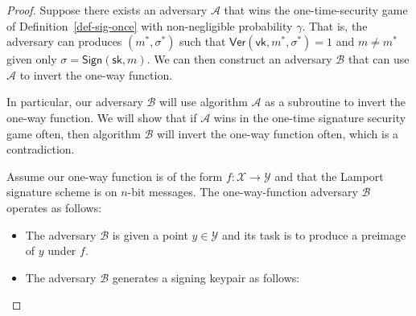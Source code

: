 \documentclass[
  letterpaper,
]{scrbook}
\providecommand{\tightlist}{%
  \setlength{\itemsep}{0pt}\setlength{\parskip}{0pt}}
\newcommand{\A}{\mathcal{A}}
\newcommand{\B}{\mathcal{B}}
\newcommand{\calA}{\mathcal{A}}
\newcommand{\calB}{\mathcal{B}}
\newcommand{\calX}{\mathcal{X}}
\newcommand{\calY}{\mathcal{Y}}
\newcommand{\Sign}{\mathsf{Sign}}
\newcommand{\Ver}{\mathsf{Ver}}
\newcommand{\sk}{\mathsf{sk}}
\newcommand{\vk}{\mathsf{vk}}
\newcommand{\sig}{\sigma}
\theoremstyle{definition}
\theoremstyle{plain}
\theoremstyle{plain}
\theoremstyle{remark}
\begin{document}
\begin{proof}
Suppose there exists an adversary \(\A\) that wins the one-time-security
game of Definition~\ref{def-sig-once} with non-negligible probability
\(\gamma\). That is, the adversary can produces \((m^*, \sig^*)\) such
that \(\Ver(\vk, m^*, \sig^*) = 1\) and \(m \neq m^*\) given only
\(\sig = \Sign(\sk, m)\). We can then construct an adversary \(\B\) that
can use \(\A\) to invert the one-way function.


In particular, our adversary \(\calB\) will use algorithm \(\calA\) as a
subroutine to invert the one-way function. We will show that if
\(\calA\) wins in the one-time signature security game often, then
algorithm \(\calB\) will invert the one-way function often, which is a
contradiction.

Assume our one-way function is of the form \(f \colon \calX \to \calY\)
and that the Lamport signature scheme is on \(n\)-bit messages. The
one-way-function adversary \(\calB\) operates as follows:

\begin{itemize}
\tightlist
\item
  The adversary \(\calB\) is given a point \(y \in \calY\) and its task
  is to produce a preimage of \(y\) under \(f\).
\item
  The adversary \(\calB\) generates a signing keypair as follows:


\end{itemize}
\end{proof}
\end{document}
